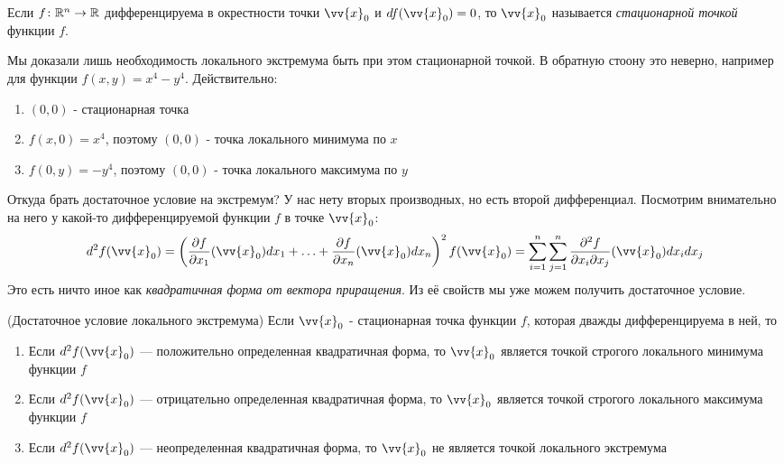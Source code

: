\begin{definition}
	Если $f \colon \mathbb{R}^n \to \mathbb{R}$ дифференцируема в окрестности точки $\vv{x}_0$ и $df(\vv{x}_0) = 0$, то $\vv{x}_0$ называется \textit{стационарной точкой} функции $f$.
\end{definition}

\begin{example}
	Мы доказали лишь необходимость локального экстремума быть при этом стационарной точкой. В обратную стоону это неверно, например для функции $f(x, y) = x^4 - y^4$. Действительно:
	\begin{enumerate}
		\item $(0, 0)$ - стационарная точка
		
		\item $f(x, 0) = x^4$, поэтому $(0, 0)$ - точка локального минимума по $x$
		
		\item $f(0, y) = -y^4$, поэтому $(0, 0)$ - точка локального максимума по $y$
	\end{enumerate}
\end{example}

\begin{note}
	Откуда брать достаточное условие на экстремум? У нас нету вторых производных, но есть второй дифференциал. Посмотрим внимательно на него у какой-то дифференцируемой функции $f$ в точке $\vv{x}_0$:
	\[
		d^2f(\vv{x}_0) = \ps{\pd{f}{x_1}(\vv{x}_0)dx_1 + \ldots + \pd{f}{x_n}(\vv{x}_0)dx_n}^2 f(\vv{x}_0) = \sum_{i = 1}^n \sum_{j = 1}^n \pd{^2 f}{x_i \vdelta x_j}(\vv{x}_0) dx_i dx_j
	\]
	Это есть ничто иное как \textit{квадратичная форма от вектора приращения}. Из её свойств мы уже можем получить достаточное условие.
\end{note}

\begin{theorem} (Достаточное условие локального экстремума)
	Если $\vv{x}_0$ - стационарная точка функции $f$, которая дважды дифференцируема в ней, то
	\begin{enumerate}
		\item Если $d^2f(\vv{x}_0)$ --- положительно определенная квадратичная форма, то $\vv{x}_0$ является точкой строгого локального минимума функции $f$
		
		\item Если $d^2f(\vv{x}_0)$ --- отрицательно определенная квадратичная форма, то $\vv{x}_0$ является точкой строгого локального максимума функции $f$
		
		\item Если $d^2f(\vv{x}_0)$ --- неопределенная квадратичная форма, то $\vv{x}_0$ не является точкой локального экстремума
	\end{enumerate}
\end{theorem}

